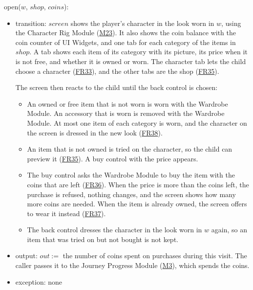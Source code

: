 \documentclass[10pt, titlepage]{article}
\newcommand{\srsurl}{https://team-hindsight.github.io/ophthamology-game/SRS/SRS.pdf}
\newcommand{\srsitemref}[2]{\href{\srsurl\#nameddest=#1}{#2}}
\newcommand{\misref}[2]{\hyperref[mis:#1]{M#2}}
\newcommand{\T}[1]{\mathit{#1}}          %
\newcommand{\out}{\mathit{out}}
\begin{document}
\begin{samepage}
\noindent open($w$, $\T{shop}$, $\T{coins}$):
\begin{itemize}
\item transition: $\T{screen}$ shows the player's character in the look worn
  in $w$, using the Character Rig Module (\misref{Rig}{23}). It also shows the
  coin balance with the coin counter of UI Widgets, and one tab for each
  category of the items in $\T{shop}$. A tab shows each item of its category
  with its picture, its price when it is not free, and whether it is owned or
  worn. The character tab lets the child choose a character
  (\srsitemref{FR_ChooseCharacter}{FR33}), and the other tabs are the shop
  (\srsitemref{FR_Shop}{FR35}).

  The screen then reacts to the child until the back control is chosen:
  \begin{itemize}
  \item An owned or free item that is not worn is worn with the Wardrobe
    Module. An accessory that is worn is removed with the Wardrobe Module. At
    most one item of each category is worn, and the character on the screen is
    dressed in the new look (\srsitemref{FR_Equip}{FR38}).
  \item An item that is not owned is tried on the character, so the child can
    preview it (\srsitemref{FR_Shop}{FR35}). A buy control with the price
    appears.
  \item The buy control asks the Wardrobe Module to buy the item with the
    coins that are left (\srsitemref{FR_Purchase}{FR36}). When the price is
    more than the coins left, the purchase is refused, nothing changes, and the
    screen shows how many more coins are needed. When the item is already
    owned, the screen offers to wear it instead
    (\srsitemref{FR_PurchaseRefused}{FR37}).
  \item The back control dresses the character in the look worn in $w$ again,
    so an item that was tried on but not bought is not kept.
  \end{itemize}
\item output: $\out :=$ the number of coins spent on purchases during this
  visit. The caller passes it to the Journey Progress Module (\misref{Progress}{3}), which spends
  the coins.
\item exception: none
\end{itemize}
\end{samepage}
\par\pagebreak[0]
\end{document}
